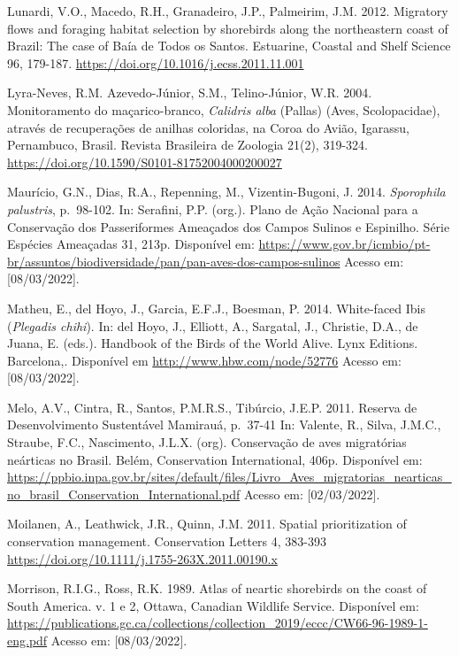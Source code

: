 \documentclass[
  oneside]{scrbook}
\begin{document}
Lunardi, V.O., Macedo, R.H., Granadeiro, J.P., Palmeirim, J.M. 2012. Migratory ﬂows and foraging habitat selection by shorebirds along the northeastern coast of Brazil: The case of Baía de Todos os Santos. Estuarine, Coastal and Shelf Science 96, 179-187. \url{https://doi.org/10.1016/j.ecss.2011.11.001}

Lyra-Neves, R.M. Azevedo-Júnior, S.M., Telino-Júnior, W.R. 2004. Monitoramento do maçarico-branco, \emph{Calidris alba} (Pallas) (Aves, Scolopacidae), através de recuperações de anilhas coloridas, na Coroa do Avião, Igarassu, Pernambuco, Brasil. Revista Brasileira de Zoologia 21(2), 319-324. \url{https://doi.org/10.1590/S0101-81752004000200027}

Maurício, G.N., Dias, R.A., Repenning, M., Vizentin-Bugoni, J. 2014. \emph{Sporophila palustris}, p.~98-102. In: Serafini, P.P. (org.). Plano de Ação Nacional para a Conservação dos Passeriformes Ameaçados dos Campos Sulinos e Espinilho. Série Espécies Ameaçadas 31, 213p. Disponível em: \url{https://www.gov.br/icmbio/pt-br/assuntos/biodiversidade/pan/pan-aves-dos-campos-sulinos} Acesso em: {[}08/03/2022{]}.

Matheu, E., del Hoyo, J., Garcia, E.F.J., Boesman, P. 2014. White-faced Ibis (\emph{Plegadis chihi}). In: del Hoyo, J., Elliott, A., Sargatal, J., Christie, D.A., de Juana, E. (eds.). Handbook of the Birds of the World Alive. Lynx Editions. Barcelona,. Disponível em \url{http://www.hbw.com/node/52776} Acesso em: {[}08/03/2022{]}.

Melo, A.V., Cintra, R., Santos, P.M.R.S., Tibúrcio, J.E.P. 2011. Reserva de Desenvolvimento Sustentável Mamirauá, p.~37-41 In: Valente, R., Silva, J.M.C., Straube, F.C., Nascimento, J.L.X. (org). Conservação de aves migratórias neárticas no Brasil. Belém, Conservation International, 406p. Disponível em: \url{https://ppbio.inpa.gov.br/sites/default/files/Livro_Aves_migratorias_nearticas_no_brasil_Conservation_International.pdf} Acesso em: {[}02/03/2022{]}.

Moilanen, A., Leathwick, J.R., Quinn, J.M. 2011. Spatial prioritization of conservation management. Conservation Letters 4, 383-393 \url{https://doi.org/10.1111/j.1755-263X.2011.00190.x}

Morrison, R.I.G., Ross, R.K. 1989. Atlas of neartic shorebirds on the coast of South America. v. 1 e 2, Ottawa, Canadian Wildlife Service. Disponível em: \url{https://publications.gc.ca/collections/collection_2019/eccc/CW66-96-1989-1-eng.pdf} Acesso em: {[}08/03/2022{]}.
\end{document}

